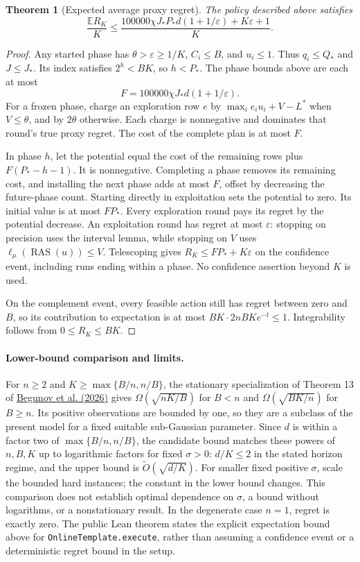 \documentclass[11pt]{article}
\newtheorem{theorem}{Theorem}
\newcommand{\E}{\mathbb E}
\begin{document}
\begin{theorem}[Expected average proxy regret]
The policy described above satisfies
\[
 \frac{\E R_K}{K}\le
 \frac{100000\chi J_*P_*d(1+1/\varepsilon)+K\varepsilon+1}{K}.
\]
\end{theorem}
\begin{proof}
Any started phase has $\theta>\varepsilon\ge1/K$, $C_i\le B$, and $u_i\le1$.
Thus $q_i\le Q_*$ and $J\le J_*$. Its index satisfies $2^h<BK$, so
$h<P_*$. The phase bounds above are each at most
\[
 F=100000\chi J_*d(1+1/\varepsilon).
\]
For a frozen phase, charge an exploration row $e$ by
$\max_i e_i u_i+V-L^*$ when $V\le\theta$, and by $2\theta$ otherwise.
Each charge is nonnegative and dominates that round's true proxy regret.
The cost of the complete plan is at most $F$.

In phase $h$, let the potential equal the cost of the remaining rows plus
$F(P_*-h-1)$. It is nonnegative. Completing a phase removes its remaining
cost, and installing the next phase adds at most $F$, offset by decreasing
the future-phase count. Starting directly in exploitation sets the potential
to zero. Its initial value is at most $FP_*$. Every exploration round pays
its regret by the potential decrease. An exploitation round has regret at
most $\varepsilon$: stopping on precision uses the interval lemma, while
stopping on $V$ uses $\ell_\mu(\operatorname{RAS}(u))\le V$.
Telescoping gives $R_K\le FP_*+K\varepsilon$ on the confidence event,
including runs ending within a phase. No confidence assertion beyond $K$ is used.

On the complement event, every feasible action still has regret between zero
and $B$, so its contribution to expectation is at most
$BK\cdot2nBK e^{-t}\le1$. Integrability follows from $0\le R_K\le BK$.
\end{proof}

\paragraph{Lower-bound comparison and limits.}
For $n\ge2$ and $K\ge\max\{B/n,n/B\}$, the stationary specialization of
Theorem 13 of \href{https://arxiv.org/abs/2610.18265}{Begunov et al. (2026)}
gives $\Omega(\sqrt{nK/B})$ for $B<n$ and $\Omega(\sqrt{BK/n})$ for $B\ge n$.
Its positive observations are bounded by one, so they are a subclass of the
present model for a fixed suitable sub-Gaussian parameter. Since
$d$ is within a factor two of $\max\{B/n,n/B\}$, the candidate bound matches
these powers of $n,B,K$ up to logarithmic factors for fixed $\sigma>0$:
$d/K\le2$ in the stated horizon regime, and the upper bound is
$\widetilde O(\sqrt{d/K})$.
For smaller fixed positive $\sigma$, scale the bounded hard instances;
the constant in the lower bound changes. This comparison does not establish
optimal dependence on $\sigma$, a bound without logarithms, or a nonstationary result.
In the degenerate case $n=1$, regret is exactly zero.
The public Lean theorem states the explicit expectation bound above for
\texttt{OnlineTemplate.execute}, rather than assuming a confidence event or
a deterministic regret bound in the setup.
\end{document}
